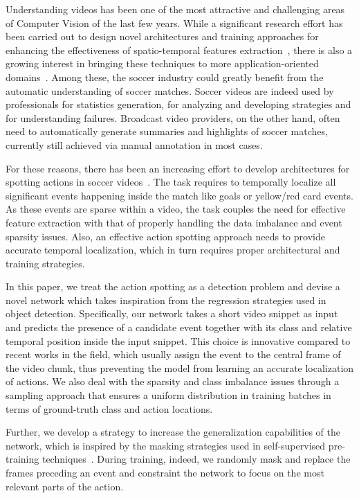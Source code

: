 \documentclass[a4paper,conference]{IEEEtran}
\begin{document}
Understanding videos has been one of the most attractive and challenging areas of Computer Vision of the last few years. While a significant research effort has been carried out to design novel architectures and training approaches for enhancing the effectiveness of spatio-temporal features extraction~\cite{feichtenhofer2019slowfast, Wu_2020_CVPR}, there is also a growing interest in bringing these techniques to more application-oriented domains~\cite{giancola2018soccernet, bertini2004semantic}. Among these, the soccer industry could greatly benefit from the automatic understanding of soccer matches. Soccer videos are indeed used by professionals for statistics generation, for analyzing and developing strategies and for understanding failures. Broadcast video providers, on the other hand, often need to automatically generate summaries and highlights of soccer matches, currently still achieved via manual annotation in most cases.

For these reasons, there has been an increasing effort to develop architectures for spotting actions in soccer videos~\cite{giancola2018soccernet,vats2020event,cioppa2020context}. The task requires to temporally localize all significant events happening inside the match like goals or yellow/red card events. As these events are sparse within a video, the task couples the need for effective feature extraction with that of properly handling the data imbalance and event sparsity issues. Also, an effective action spotting approach needs to provide accurate temporal localization, which in turn requires proper architectural and training strategies.

In this paper, we treat the action spotting as a detection problem and devise a novel network which takes inspiration from the regression strategies used in object detection. Specifically, our network takes a short video snippet as input and predicts the presence of a candidate event together with its class and relative temporal position inside the input snippet. This choice is innovative compared to recent works in the field, which usually assign the event to the central frame of the video chunk, thus preventing the model from learning an accurate localization of actions. We also deal with the sparsity and class imbalance issues through a sampling approach that ensures a uniform distribution in training batches in terms of ground-truth class and action locations.

Further, we develop a strategy to increase the generalization capabilities of the network, which is inspired by the masking strategies used in self-supervised pre-training techniques~\cite{devlin2018bert}. During training, indeed, we randomly mask and replace the frames preceding an event and constraint the network to focus on the most relevant parts of the action. 
\end{document}
